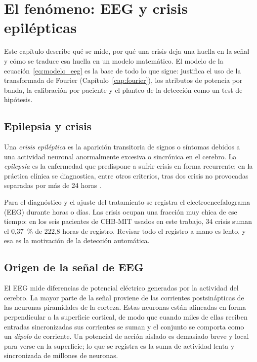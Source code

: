 \chapter{El fenómeno: EEG y crisis epilépticas}
\label{cap:fenomeno}

Este capítulo describe qué se mide, por qué una crisis deja una huella en la señal y cómo se traduce
esa huella en un modelo matemático. El modelo de la ecuación~\eqref{eq:modelo_eeg} es la base de todo
lo que sigue: justifica el uso de la transformada de Fourier (Capítulo~\ref{cap:fourier}), los atributos de
potencia por banda, la calibración por paciente y el planteo de la detección como un test de hipótesis.

\section{Epilepsia y crisis}

Una \emph{crisis epiléptica} es la aparición transitoria de signos o síntomas debidos a una actividad
neuronal anormalmente excesiva o sincrónica en el cerebro. La \emph{epilepsia} es la enfermedad que
predispone a sufrir crisis en forma recurrente; en la práctica clínica se diagnostica, entre otros
criterios, tras dos crisis no provocadas separadas por más de 24 horas \parencite{fisher2014}.

Para el diagnóstico y el ajuste del tratamiento se registra el electroencefalograma (EEG) durante
horas o días. Las crisis ocupan una fracción muy chica de ese tiempo: en los seis pacientes de
CHB-MIT usados en este trabajo, 34 crisis suman el 0,37~\% de 222,8 horas de registro. Revisar todo
el registro a mano es lento, y esa es la motivación de la detección automática.

\section{Origen de la señal de EEG}

El EEG mide diferencias de potencial eléctrico generadas por la actividad del cerebro. La mayor
parte de la señal proviene de las corrientes postsinápticas de las neuronas piramidales de la corteza.
Estas neuronas están alineadas en forma perpendicular a la superficie cortical, de modo que cuando
miles de ellas reciben entradas sincronizadas sus corrientes se suman y el conjunto se comporta como
un \emph{dipolo} de corriente. Un potencial de acción aislado es demasiado breve y local para verse en
la superficie; lo que se registra es la suma de actividad lenta y sincronizada de millones de neuronas.


